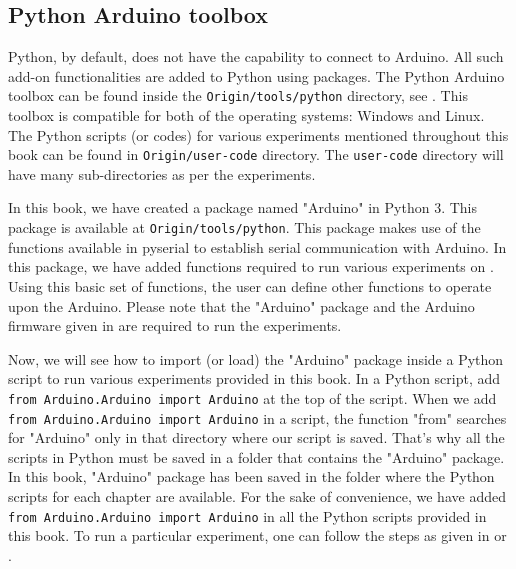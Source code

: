 



\subsection{Python Arduino toolbox}
\label{sec:python-toolbox}
Python, by default, does not have the capability to connect to Arduino. 
All such add-on functionalities are added to Python using packages. 
The Python Arduino toolbox can be found inside the {\tt Origin/tools/python} directory, 
see .  This toolbox is compatible for both of the operating systems: Windows and Linux. 
The Python scripts (or codes) for various experiments mentioned throughout this book can be found in 
{\tt Origin/user-code} directory. The {\tt user-code} directory will have many sub-directories as per the experiments. 

In this book, we have created a package named "Arduino" in Python 3.  This package is available at 
{\tt Origin/tools/python}. This package makes use of the functions available in pyserial \cite{pySerial} to 
establish serial communication with Arduino. In this package, we have added functions required to run 
various experiments on \arduino. Using this basic set of functions, the user can define other functions to operate
upon the Arduino. Please note that the "Arduino" package and the Arduino firmware  given 
in  are required to run the experiments. 

Now, we will see how to import (or load) the "Arduino" package inside a Python script to run 
various experiments provided in this book. In a Python script, add {\tt from Arduino.Arduino import Arduino} 
at the top of the script. When we add {\tt from Arduino.Arduino import Arduino} in a script, the function "from" 
searches for "Arduino" only in that directory where our script is saved. That's why all the scripts in Python 
must be saved in a folder that contains the "Arduino" package. In this book, "Arduino" package has been saved 
in the folder where the Python scripts for each chapter are available. For the sake of convenience, we have 
added {\tt from Arduino.Arduino import Arduino} in all the Python scripts provided in this book. 
To run a particular experiment, one can follow the steps as given in  or . 


